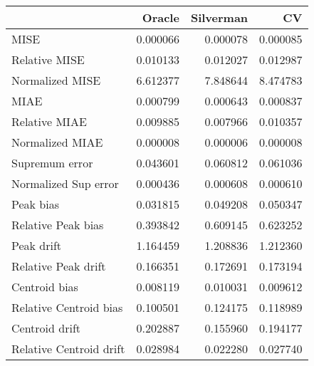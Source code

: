\begin{tabular}{lrrr}
  \toprule
 & Oracle & Silverman & CV \\ 
  \midrule
MISE & 0.000066 & 0.000078 & 0.000085 \\ 
  Relative MISE & 0.010133 & 0.012027 & 0.012987 \\ 
  Normalized MISE & 6.612377 & 7.848644 & 8.474783 \\ 
  MIAE & 0.000799 & 0.000643 & 0.000837 \\ 
  Relative MIAE & 0.009885 & 0.007966 & 0.010357 \\ 
  Normalized MIAE & 0.000008 & 0.000006 & 0.000008 \\ 
  Supremum error & 0.043601 & 0.060812 & 0.061036 \\ 
  Normalized Sup error & 0.000436 & 0.000608 & 0.000610 \\ 
  Peak bias & 0.031815 & 0.049208 & 0.050347 \\ 
  Relative Peak bias & 0.393842 & 0.609145 & 0.623252 \\ 
  Peak drift & 1.164459 & 1.208836 & 1.212360 \\ 
  Relative Peak drift & 0.166351 & 0.172691 & 0.173194 \\ 
  Centroid bias & 0.008119 & 0.010031 & 0.009612 \\ 
  Relative Centroid bias & 0.100501 & 0.124175 & 0.118989 \\ 
  Centroid drift & 0.202887 & 0.155960 & 0.194177 \\ 
  Relative Centroid drift & 0.028984 & 0.022280 & 0.027740 \\ 
   \bottomrule
\end{tabular}
